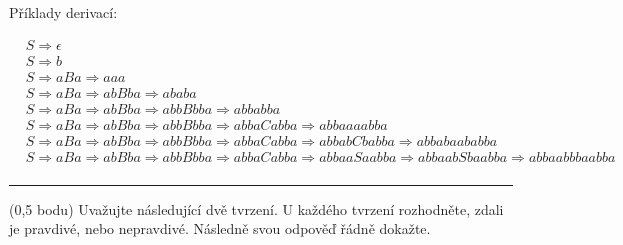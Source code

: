 \documentclass[10pt]{article}
\begin{document}
\begin{description}
       Příklady derivací:

        \begin{align*}
        & S \Rightarrow \epsilon \\
        & S \Rightarrow b \\
        & S \Rightarrow aBa \Rightarrow aaa \\
        & S \Rightarrow aBa \Rightarrow abBba \Rightarrow ababa \\
        & S \Rightarrow aBa \Rightarrow abBba \Rightarrow abbBbba \Rightarrow abbabba \\
        & S \Rightarrow aBa \Rightarrow abBba \Rightarrow abbBbba \Rightarrow abbaCabba \Rightarrow abbaaaabba \\
        & S \Rightarrow aBa \Rightarrow abBba \Rightarrow abbBbba \Rightarrow abbaCabba \Rightarrow abbabCbabba \Rightarrow abbabaababba\\
        & S \Rightarrow aBa \Rightarrow abBba \Rightarrow abbBbba \Rightarrow abbaCabba \Rightarrow abbaaSaabba \Rightarrow abbaabSbaabba \Rightarrow abbaabbbaabba\\
        \end{align*}
        
\end{description}

\noindent\rule{\textwidth}{0.4pt}
\vskip 0.3cm

\noindent
(0,5 bodu) Uvažujte následující dvě tvrzení. U každého tvrzení rozhodněte, zdali je pravdivé, nebo nepravdivé. Následně svou odpověď řádně dokažte. 
\end{document}
